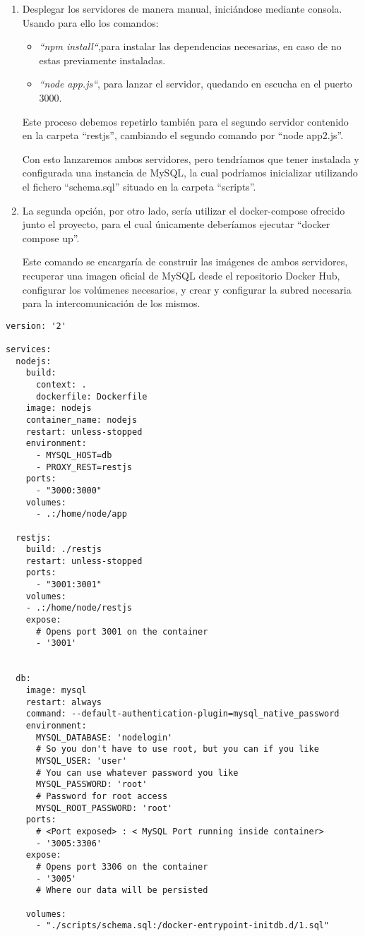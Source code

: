 \begin{enumerate}
\item Desplegar los servidores de manera manual, iniciándose mediante
  consola. Usando para ello los comandos:
  \begin{itemize}
  \item \textit{“npm install“},para instalar las dependencias necesarias,
    en caso de no estas previamente instaladas.
  \item \textit{“node app.js“}, para lanzar el servidor, quedando en
    escucha en el puerto 3000.
  \end{itemize}

  Este proceso debemos repetirlo también para el segundo servidor contenido
  en la carpeta “restjs”, cambiando el segundo comando por “node app2.js”.

  Con esto lanzaremos ambos servidores, pero tendríamos que tener instalada
  y configurada una instancia de MySQL, la cual podríamos inicializar
  utilizando el fichero “schema.sql” situado en la carpeta “scripts”.

\item La segunda opción, por otro lado, sería utilizar el docker-compose
  ofrecido junto el proyecto, para el cual únicamente deberíamos ejecutar
  “docker compose up”.

  Este comando se encargaría de construir las imágenes de ambos servidores,
  recuperar una imagen oficial de MySQL desde el repositorio Docker Hub,
  configurar los volúmenes necesarios, y crear y configurar la subred
  necesaria para la intercomunicación de los mismos.


\end{enumerate}

\begin{lstlisting}
version: '2'

services:
  nodejs:
    build:
      context: .
      dockerfile: Dockerfile
    image: nodejs
    container_name: nodejs
    restart: unless-stopped
    environment:
      - MYSQL_HOST=db
      - PROXY_REST=restjs
    ports:
      - "3000:3000"
    volumes:
      - .:/home/node/app

  restjs:
    build: ./restjs
    restart: unless-stopped
    ports:
      - "3001:3001"
    volumes:
    - .:/home/node/restjs
    expose:
      # Opens port 3001 on the container
      - '3001'


  db:
    image: mysql
    restart: always
    command: --default-authentication-plugin=mysql_native_password
    environment:
      MYSQL_DATABASE: 'nodelogin'
      # So you don't have to use root, but you can if you like
      MYSQL_USER: 'user'
      # You can use whatever password you like
      MYSQL_PASSWORD: 'root'
      # Password for root access
      MYSQL_ROOT_PASSWORD: 'root'
    ports:
      # <Port exposed> : < MySQL Port running inside container>
      - '3005:3306'
    expose:
      # Opens port 3306 on the container
      - '3005'
      # Where our data will be persisted

    volumes:
      - "./scripts/schema.sql:/docker-entrypoint-initdb.d/1.sql"

\end{lstlisting}

